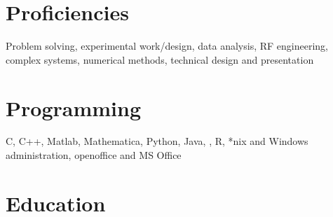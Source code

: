 \documentclass[margin,line]{resume}
\begin{document}
\begin{resume}
    \section{\mysidestyle Proficiencies}

Problem solving, experimental work/design, data analysis, RF engineering, complex systems, numerical methods, technical design and presentation


    \section{\mysidestyle Programming} 

    C, C++, Matlab, Mathematica, Python, Java, \LaTeXe, R, *nix and Windows administration, openoffice and MS Office


    \section{\mysidestyle Education}


\end{resume}
\end{document}
